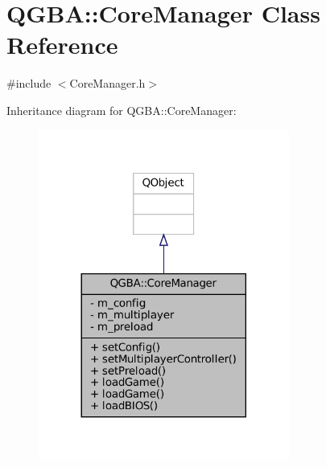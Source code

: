 \hypertarget{class_q_g_b_a_1_1_core_manager}{}\section{Q\+G\+BA\+:\+:Core\+Manager Class Reference}
\label{class_q_g_b_a_1_1_core_manager}


{\ttfamily \#include $<$Core\+Manager.\+h$>$}



Inheritance diagram for Q\+G\+BA\+:\+:Core\+Manager\+:
\nopagebreak
\begin{figure}[H]
\begin{center}
\leavevmode
\includegraphics[width=233pt]{class_q_g_b_a_1_1_core_manager__inherit__graph}
\end{center}
\end{figure}


